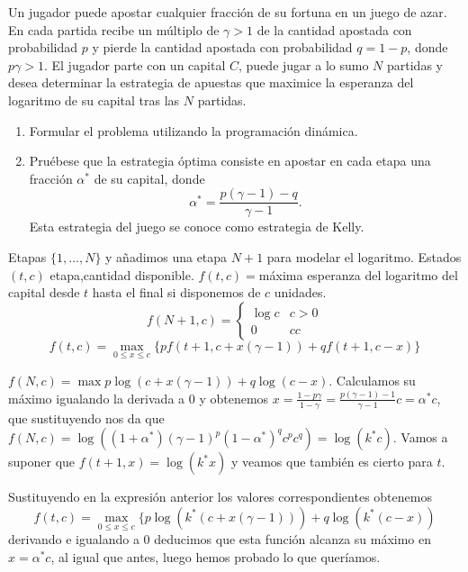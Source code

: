\documentclass[twoside]{article}
\begin{document}
\newpage 
\begin{ejercicio}{5}
Un jugador puede apostar cualquier fracción de su fortuna en un juego de azar. En cada partida recibe un múltiplo de $\gamma>1$ de la cantidad apostada con probabilidad $p$ y pierde la cantidad apostada con probabilidad $q=1-p$, donde $p\gamma>1$. El jugador parte con un capital $C$, puede jugar a lo sumo $N$ partidas y desea determinar la estrategia de apuestas que maximice la esperanza del logaritmo de su capital tras las $N$ partidas.
\begin{enumerate}
\item Formular el problema utilizando la programación dinámica.
\item Pruébese que la estrategia óptima consiste en apostar en cada etapa una fracción $\alpha^*$ de su capital, donde
$$\alpha^*=\frac{p(\gamma-1)-q}{\gamma-1}.$$
Esta estrategia del juego se conoce como estrategia de Kelly.
\end{enumerate}
\begin{solucion}
Etapas $\{1,\dots, N\}$ y añadimos una etapa $N+1$ para modelar el logaritmo.
Estados $(t,c)$ etapa,cantidad disponible. 
$f(t,c)=$máxima esperanza del logaritmo del capital desde $t$ hasta el final si disponemos de $c$ unidades.
$$f(N+1,c)=\begin{cases}
\log{c} & c>0\\
0 & cc
\end{cases}$$
$$f(t,c)=\max_{0\leq x\leq c}\{pf(t+1,c+x(\gamma-1))+qf(t+1,c-x)\}$$ 

$f(N,c)=\max p\log(c+x(\gamma-1))+q\log(c-x)$. Calculamos su máximo igualando la derivada a 0 y obtenemos $x=\frac{1-p\gamma}{1-\gamma}=\frac{p(\gamma-1)-1}{\gamma-1}c=\alpha^* c$, que sustituyendo nos da que $f(N,c)=\log((1+\alpha^*)(\gamma-1)^p(1-\alpha^*)^qc^pc^q)=\log(k^*c)$. Vamos a suponer que $f(t+1,x)=\log(k^*x)$ y veamos que también es cierto para $t$.

Sustituyendo en la expresión anterior los valores correspondientes obtenemos
$$f(t,c)=\max_{0\leq x\leq c}\{p\log(k^*(c+x(\gamma-1)))+q\log(k^*(c-x))$$
derivando e igualando a 0 deducimos que esta función alcanza su máximo en $x=\alpha^*c$, al igual que antes, luego hemos probado lo que queríamos.
\end{solucion}
\end{ejercicio}
\end{document}
